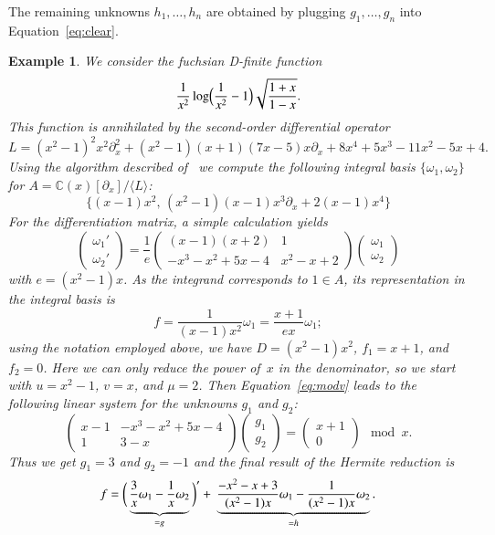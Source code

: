 \documentclass[final,1p,times,authoryear]{elsarticle}
\newtheorem{example}[theorem]{Example}
\def\<#1>{\langle#1\rangle}
\newcommand{\bC}{ {\mathbb C}}
\begin{document}
The remaining unknowns $h_1,\ldots,h_n$ are obtained by plugging
$g_1,\ldots,g_n$ into Equation~\eqref{eq:clear}.


\begin{example}\label{ex:hr}
We consider the fuchsian D-finite function
\[
  \frac{1}{x^2} \log\Bigl(\frac{1}{x^2}-1\Bigr)\sqrt{\frac{1+x}{1-x}}.
\]
This function is annihilated by the second-order differential operator
\[
  L = (x^2-1)^2 x^2 \partial_x^2 + (x^2-1) (x+1) (7x-5) x \partial_x + 
    8x^4+5x^3-11x^2-5x+4.
\]
Using the algorithm described of~\cite{kauers15b} we compute the following
integral basis $\{\omega_1,\omega_2\}$ for $A=\bC(x)[\partial_x]/\<L>$:
\[
  \bigl\{ (x-1) x^2,\, (x^2-1) (x-1) x^3 \partial_x + 2(x-1) x^4 \bigr\}
\]
For the differentiation matrix, a simple calculation yields
\begin{equation}\label{eq:dmat}
  \begin{pmatrix} \omega_1' \\[2pt] \omega_2' \end{pmatrix} =
  \frac{1}{e} \begin{pmatrix} (x-1) (x+2) & 1 \\[2pt] -x^3-x^2+5x-4 & x^2-x+2 \end{pmatrix}
  \begin{pmatrix} \omega_1 \\[2pt] \omega_2 \end{pmatrix}
\end{equation}
with $e=(x^2-1)x$. As the integrand corresponds to $1\in A$, its
representation in the integral basis is
\[
  f = \frac{1}{(x-1)x^2} \omega_1 = \frac{x+1}{ex} \omega_1;
\]
using the notation employed above, we have $D=(x^2-1)x^2$, $f_1=x+1$,
and $f_2=0$. Here we can only reduce the power of~$x$ in the denominator, so
we start with $u=x^2-1$, $v=x$, and $\mu=2$. Then Equation~\eqref{eq:modv} leads
to the following linear system for the unknowns $g_1$ and $g_2$:
\[
  \begin{pmatrix} x-1 & -x^3-x^2+5 x-4 \\ 1 & 3-x \end{pmatrix}
  \begin{pmatrix} g_1 \\ g_2 \end{pmatrix} =
  \begin{pmatrix} x+1 \\ 0 \end{pmatrix} \mod x.
\]
Thus we get $g_1=3$ and $g_2=-1$ and the final result of the Hermite reduction is
\[
f=
  \biggl(\, \underbrace{\vphantom{\frac{1}{(x)}}  \frac{3}{x} \omega_1 - \frac{1}{x} \omega_2}_{=g} \,\biggr)' +\>
  \underbrace{\frac{-x^2-x+3}{(x^2-1)x} \omega_1 - \frac{1}{(x^2-1)x} \omega_2}_{=h}.
\]
\end{example}
\end{document}
